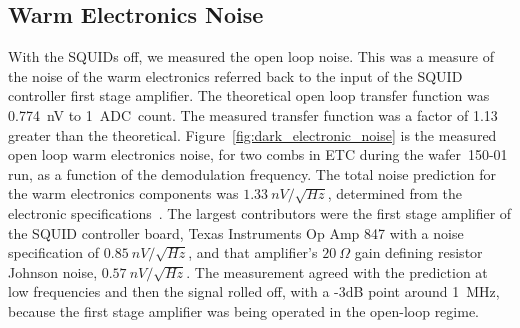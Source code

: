 


\subsection{Warm Electronics Noise}
\label{sec:warm_electronics}


With the \ac{SQUID}s off, we measured the open loop noise.
This was a measure of the noise of the warm electronics referred back to the input of the \ac{SQUID} controller first stage amplifier. 
The theoretical open loop transfer function was 0.774~nV to 1~\ac{ADC}~count. 
The measured transfer function was a factor of 1.13 greater than the theoretical. 
Figure~\ref{fig:dark_electronic_noise} is the measured open loop warm electronics noise, for two combs in \ac{ETC} during the wafer~150-01 run, as a function of the demodulation frequency. 
The total noise prediction for the warm electronics components was $1.33~nV/\sqrt{Hz}$, determined from the electronic specifications~\cite{Francois2012}. 
The largest contributors were the first stage amplifier of the \ac{SQUID} controller board, Texas Instruments Op Amp 847 with a noise specification of $0.85~nV/\sqrt{Hz}$, and that amplifier's $20~\Omega$ gain defining resistor Johnson noise, $0.57~nV/\sqrt{Hz}$. 
The measurement agreed with the prediction at low frequencies and then the signal rolled off, with a -3dB point around 1~MHz, because the first stage amplifier was being operated in the open-loop regime.

